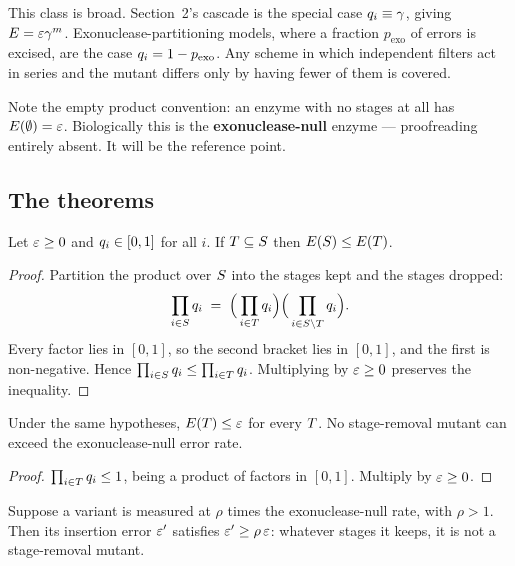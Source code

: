 This class is broad. Section~2's cascade is the special case $q_i \equiv \gamma$,
giving $E = \varepsilon\gamma^{m}$. Exonuclease-partitioning models, where a
fraction $p_{\mathrm{exo}}$ of errors is excised, are the case
$q_i = 1 - p_{\mathrm{exo}}$. Any scheme in which independent filters act in
series and the mutant differs only by having fewer of them is covered.

Note the empty product convention: an enzyme with no stages at all has
$E(\emptyset) = \varepsilon$. Biologically this is the \textbf{exonuclease-null}
enzyme --- proofreading entirely absent. It will be the reference point.

\subsection{The theorems}

\begin{theorem}\label{thm:psr1}
Let $\varepsilon \ge 0$ and $q_i \in [0,1]$ for all $i$. If $T \subseteq S$ then
$E(S) \le E(T)$.
\end{theorem}

\begin{proof}
Partition the product over $S$ into the stages kept and the stages dropped:
\[
  \prod_{i \in S} q_i
  \;=\; \Big(\prod_{i \in T} q_i\Big)\Big(\prod_{i \in S \setminus T} q_i\Big).
\]
Every factor lies in $[0,1]$, so the second bracket lies in $[0,1]$, and the first
is non-negative. Hence $\prod_{i\in S}q_i \le \prod_{i \in T}q_i$.
Multiplying by $\varepsilon \ge 0$ preserves the inequality.
\end{proof}

\begin{theorem}\label{thm:psr2}
Under the same hypotheses, $E(T) \le \varepsilon$ for every $T$. No
stage-removal mutant can exceed the exonuclease-null error rate.
\end{theorem}

\begin{proof}
$\prod_{i \in T} q_i \le 1$, being a product of factors in $[0,1]$. Multiply
by $\varepsilon \ge 0$.
\end{proof}

\begin{theorem}\label{thm:psr3}
Suppose a variant is measured at $\rho$ times the exonuclease-null rate, with
$\rho > 1$. Then its insertion error $\varepsilon'$ satisfies $\varepsilon' \ge \rho\,\varepsilon$:
whatever stages it keeps, it is not a stage-removal mutant.
\end{theorem}

